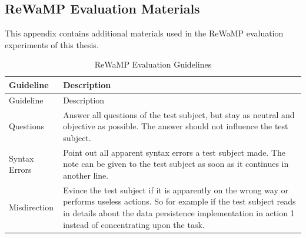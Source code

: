 \begin{appendix}
\chapter{ReWaMP Evaluation Materials}
This appendix contains additional materials used in the ReWaMP evaluation experiments of this thesis.
\hypertarget{tbl:rewamp.guidelines}{}
\begin{longtable}[h]{@{}ll@{}}
\caption{ReWaMP Evaluation Guidelines}
\label{tbl:rewamp.guidelines}\tabularnewline
\toprule
\begin{minipage}[b]{0.17\columnwidth}\raggedright
Guideline\strut
\end{minipage} & \begin{minipage}[b]{0.77\columnwidth}\raggedright
Description\strut
\end{minipage}\tabularnewline
\midrule
\endfirsthead
\toprule
\begin{minipage}[b]{0.17\columnwidth}\raggedright
Guideline\strut
\end{minipage} & \begin{minipage}[b]{0.77\columnwidth}\raggedright
Description\strut
\end{minipage}\tabularnewline
\midrule
\endhead
\begin{minipage}[t]{0.17\columnwidth}\raggedright
Questions\strut
\end{minipage} & \begin{minipage}[t]{0.77\columnwidth}\raggedright
Answer all questions of the test subject, but stay as neutral and objective as possible.
The answer should not influence the test subject.\strut
\end{minipage}\tabularnewline
\begin{minipage}[t]{0.17\columnwidth}\raggedright
Syntax Errors\strut
\end{minipage} & \begin{minipage}[t]{0.77\columnwidth}\raggedright
Point out all apparent syntax errors a test subject made.
The note can be given to the test subject as soon as it continues in another line.\strut
\end{minipage}\tabularnewline
\begin{minipage}[t]{0.17\columnwidth}\raggedright
Misdirection\strut
\end{minipage} & \begin{minipage}[t]{0.77\columnwidth}\raggedright
Evince the test subject if it is apparently on the wrong way or performs useless actions.
So for example if the test subject reads in details about the data persistence implementation in action 1 instead of concentrating upon the task.\strut

\end{minipage}
\end{longtable}
\end{appendix}
